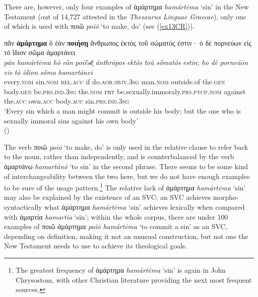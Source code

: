\documentclass[output=paper,colorlinks,citecolor=brown]{langscibook}
\begin{document}
There are, however, only four examples of ἁμάρτημα \textit{hamártēma} ‘sin' in the New Testament
(out of 14,727 attested in the \textit{Thesaurus Linguae Graecae}), only one of which is used with ποιῶ \textit{poiō} ‘to make, do' (see (\ref{ex13CR})).

 {
\ea\label{ex13CR} 
\glll πᾶν \textbf{ἁμάρτημα} ὃ ἐὰν \textbf{ποιήσῃ} ἄνθρωπος ἐκτὸς τοῦ σώματός ἐστιν· ὁ δὲ πορνεύων εἰς τὸ ἴδιον σῶμα ἁμαρτάνει\\
\textit{pãn} \textit{hamártēma} \textit{hò} \textit{eàn} \textit{poiḗsēͅ} \textit{ánthrōpos} \textit{ektòs} \textit{toũ} \textit{sṓmatós} \textit{estin}; \textit{ho} \textit{dè} \textit{porneúōn} \textit{eis} \textit{tò} \textit{ídion} \textit{sō̃ma} \textit{hamartánei}\\
    every.\textsc{nom} sin.\textsc{nom} \textsc{rel}.\textsc{acc} if do.\textsc{aor.sbjv.3sg} man.\textsc{nom} outside.of the.\textsc{gen} body.\textsc{gen} be.\textsc{prs.ind.3sg} the.\textsc{nom} \textsc{prt} be.sexually.immoraly.\textsc{prs.ptcp.nom} against the.\textsc{acc} own.\textsc{acc} body.\textsc{acc} sin.\textsc{prs.ind.3sg} \\

\glt `Every sin which a man might commit is outside his body; but the one who is sexually immoral sins against his own body' \\
\hspace*{\fill}()
 
\z
}

The verb ποιῶ \textit{poiō} ‘to make, do' is only used in the relative clause to refer back to the
noun, rather than independently, and is counterbalanced by the verb
ἁμαρτάνω \textit{hamartánō} ‘to sin' in the second phrase. 
There seems to be some kind of
interchangeability between the two here, but we do not have enough
examples to be sure of the usage pattern.\footnote{The greatest
  frequency of ἁμάρτημα \textit{hamártēma} ‘sin' is again in John Chrysostom, with other
  Christian literature providing the next most frequent sources.} 
  The
relative lack of ἁμάρτημα \textit{hamártēma} ‘sin' may also be explained by the existence of an SVC;
an SVC achieves morpho-syntactically what ἁμάρτημα \textit{hamártēma} ‘sin' achieves lexically
when compared with ἁμαρτία \textit{hamartia} ‘sin'; within the whole corpus, there are
under 100 examples of ποιῶ ἁμάρτημα \textit{poiō hamártēma} ‘to commit a sin' as an SVC, depending on definition,
making it not an unusual construction, but not one the New Testament
needs to use to achieve its theological goals.
\end{document}
